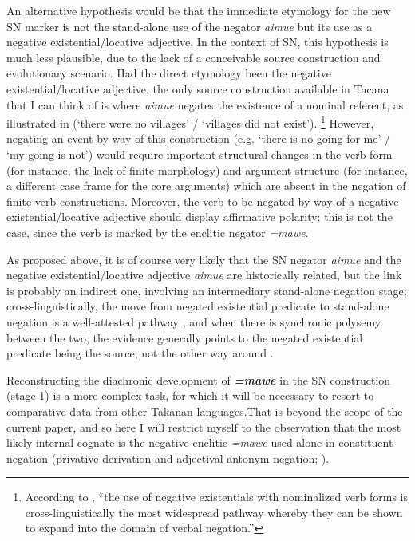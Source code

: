 \documentclass[output=paper]{langsci/langscibook}
\begin{document}
%
An alternative hypothesis would be that the immediate etymology for the new
SN marker is not the stand-alone use of the negator \textit{aimue} but its
use as a negative existential\slash locative adjective. In the context of
SN, this hypothesis is much less plausible, due to the lack of a
conceivable source construction and evolutionary scenario. Had the direct
etymology been the negative existential\slash locative adjective, the only
source construction available in Tacana that I can think of is where
\textit{aimue} negates the existence of a nominal referent, as illustrated
in  (`there were no villages' \slash{} `villages
did not exist').%
%
\footnote{According to \textcite[157]{Veselinova2016}, ``the use of
negative existentials with nominalized verb forms is cross-linguistically
the most widespread pathway whereby they can be shown to expand into the
domain of verbal negation.''} 
%
However, negating an event by way of this construction (e.g. `there
is no going for me' \slash{}  `my going is not') would require important
structural changes in the verb form (for instance, the lack of finite
morphology) and argument structure (for instance, a different case frame
for the core arguments) which are absent in the negation of finite verb
constructions. Moreover, the verb to be negated by way of a negative
existential\slash locative adjective should display affirmative polarity;
this is not the case, since the verb is marked by the enclitic negator
\textit{=mawe}.

As proposed above, it is of course very likely that the SN negator
\textit{aimue} and the negative existential\slash locative adjective
\textit{aimue} are historically related, but the link is probably an
indirect one, involving an intermediary stand-alone negation stage;
cross-linguistically, the move from negated existential predicate to
stand-alone negation is a well-attested pathway 
\parencites[10,
13--14]{Croft1991}[127ff]{Veselinova2013-tac}[155--156]{Veselinova2016},
and when there is synchronic polysemy between the two, the evidence
generally points to the negated existential predicate being the source, not
the other way around \citep[8]{Croft1991}.

Reconstructing the diachronic development of \textbf{\textit{=mawe}} in the
SN construction (stage 1) is a more complex task, for which it will be
necessary to resort to comparative data from other Takanan languages.That 
is beyond the scope of the current paper, and so here I will restrict
myself to the observation that the most likely internal cognate is the
negative
enclitic \textit{=mawe} used alone in constituent negation (privative
derivation and adjectival antonym negation; ).
\end{document}

